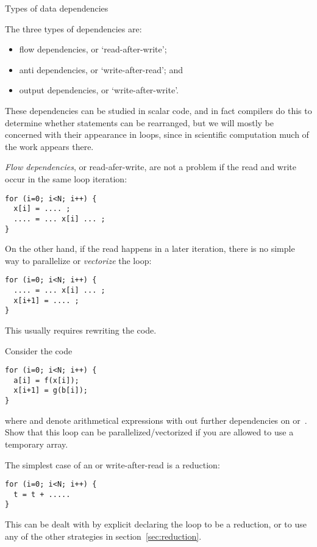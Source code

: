  {Types of data dependencies}

The three types of dependencies are:
\begin{itemize}
\item flow dependencies, or `read-after-write';
\item anti dependencies, or `write-after-read'; and
\item output dependencies, or `write-after-write'.
\end{itemize}
These dependencies can be studied in scalar code, and in fact
compilers do this to determine whether statements can be rearranged,
but we will mostly be concerned with their appearance in loops, since
in scientific computation much of the work appears there.


\emph{Flow dependencies}, or read-afer-write,
are not a problem if the read and write occur in the same
loop iteration:
\lstset{language=C}
\begin{lstlisting}
for (i=0; i<N; i++) {
  x[i] = .... ;
  .... = ... x[i] ... ;
}
\end{lstlisting}
On the other hand, if the read happens in a later iteration,
there is no simple way to parallelize or
\emph{vectorize}
the loop:
\lstset{language=C}
\begin{lstlisting}
for (i=0; i<N; i++) {
  .... = ... x[i] ... ;
  x[i+1] = .... ;
}
\end{lstlisting}
This usually requires rewriting the code.

\begin{exercise}
  Consider the code
\lstset{language=C}
\begin{lstlisting}
for (i=0; i<N; i++) {
  a[i] = f(x[i]);
  x[i+1] = g(b[i]);
}
\end{lstlisting}
where  and  denote arithmetical expressions
with out further dependencies on  or~.
Show that this loop can be parallelized/vectorized
if you are allowed to use a temporary array.
\end{exercise}


The simplest case of an  or
write-after-read is a reduction:
\lstset{language=C}
\begin{lstlisting}
for (i=0; i<N; i++) {
  t = t + .....
}
\end{lstlisting}
This can be dealt with by explicit declaring the loop to be a reduction,
or to use any of the other strategies in section~\ref{sec:reduction}.

